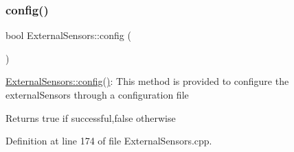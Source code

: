 \subsubsection{\texorpdfstring{config()}{config()}\hspace{0.1cm}{\footnotesize\ttfamily [1/2]}}
{\footnotesize\ttfamily bool External\+Sensors\+::config (\begin{DoxyParamCaption}{ }\end{DoxyParamCaption})}

\hyperlink{class_external_sensors_a862a4bd11346b37270d0244c2adabe5a}{External\+Sensors\+::config()}\+: This method is provided to configure the external\+Sensors through a configuration file

\begin{DoxyReturn}{Returns}
true if successful,false otherwise 
\end{DoxyReturn}


Definition at line 174 of file External\+Sensors.\+cpp.



